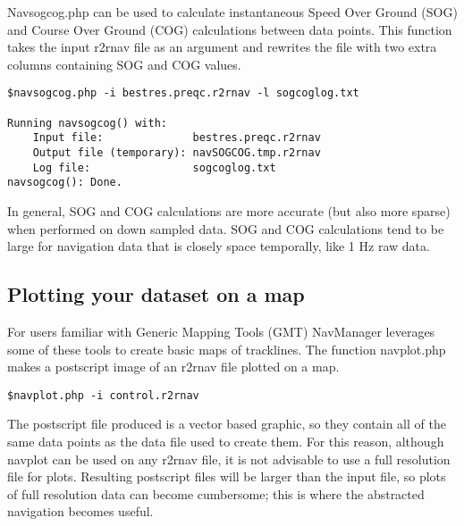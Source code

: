 \documentclass{article}
\begin{document}
Navsogcog.php can be used to calculate instantaneous Speed Over Ground (SOG) and Course Over Ground (COG) calculations between data points.  This function takes the input r2rnav file as an argument and rewrites the file with two extra columns containing SOG and COG values.

		\begin{lstlisting}
$navsogcog.php -i bestres.preqc.r2rnav -l sogcoglog.txt

Running navsogcog() with:
	Input file:              bestres.preqc.r2rnav
	Output file (temporary): navSOGCOG.tmp.r2rnav
	Log file:                sogcoglog.txt
navsogcog(): Done.
		\end{lstlisting}
		
In general, SOG and COG calculations are more accurate (but also more sparse) when performed on down sampled data.  SOG and COG calculations tend to be large for navigation data that is closely space temporally, like 1 Hz raw data.
			
		\subsection{Plotting your dataset on a map}
		\label{navplot}
		
For users familiar with Generic Mapping Tools (GMT) NavManager leverages some of these tools to create basic maps of tracklines.  The function navplot.php makes a postscript image of an r2rnav file plotted on a map.  

		\begin{lstlisting}
$navplot.php -i control.r2rnav
		\end{lstlisting}

The postscript file produced is a vector based graphic, so they contain all of the same data points as the data file used to create them.  For this reason, although navplot can be used on any r2rnav file, it is not advisable to use a full resolution file for plots.  Resulting postscript files will be larger than the input file, so plots of full resolution data can become cumbersome; this is where the abstracted navigation becomes useful.

		
\end{document}
